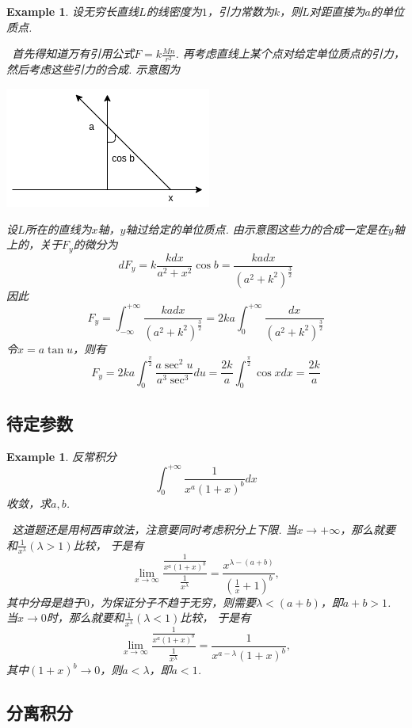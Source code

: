 \documentclass{article}
\newtheorem{example}[theorem]{Example}
\newcommand{\hints}{{\color{blue} \text{hints}}}
\begin{document}
\begin{example}
\rm 设无穷长直线$L$的线密度为$1$，引力常数为$k$，则$L$对距直接为$a$的单位质点.

\hints\ 首先得知道万有引用公式$F = k \frac{Mn}{r^2}$. 再考虑直线上某个点对给定单位质点的引力，然后考虑这些引力的合成. 示意图为
\begin{center}
\includegraphics[scale=0.6]{images/universal_gravitation.png}
\end{center}
设$L$所在的直线为$x$轴，$y$轴过给定的单位质点. 由示意图这些力的合成一定是在$y$轴上的，关于$F_y$的微分为
$$
dF_y = k \frac{kdx}{a^2 + x^2} \cos b = \frac{kadx}{(a^2+k^2)^{\frac{3}{2}}}
$$
因此
$$
F_y = \int_{-\infty}^{+\infty} \frac{kadx}{(a^2+k^2)^{\frac{3}{2}}} = 2ka \int_{0}^{+\infty} \frac{dx}{(a^2+k^2)^{\frac{3}{2}}}
$$
令$x = a\tan u$，则有
$$
F_y = 2ka \int_{0}^{\frac{\pi}{2}} \frac{a\sec^2 u}{a^3\sec^3}du = \frac{2k}{a} \int_{0}^{\frac{\pi}{2}} \cos x dx = \frac{2k}{a}
$$
\end{example}

\subsection{待定参数}

\begin{example}
\rm 反常积分
$$
\int_0^{+\infty} \frac{1}{x^a(1+x)^b}dx
$$
收敛，求$a,b$.

\hints\ 这道题还是用柯西审敛法，注意要同时考虑积分上下限. 当$x \to +\infty$，那么就要和$\frac{1}{x^{\lambda}}(\lambda >1)$比较， 于是有
$$
\lim\limits_{x \to \infty} \frac{\frac{1}{x^a(1+x)^b}}{\frac{1}{x^{\lambda}}} = \frac{x^{\lambda-(a+b)}}{(\frac{1}{x}+1)^b},
$$
其中分母是趋于$0$，为保证分子不趋于无穷，则需要$\lambda < (a+b)$，即$a+b > 1$. 当$x \to 0$时，那么就要和$\frac{1}{x^{\lambda}}(\lambda < 1)$比较， 于是有
$$
\lim\limits_{x \to \infty} \frac{\frac{1}{x^a(1+x)^b}}{\frac{1}{x^{\lambda}}} = \frac{1}{x^{a-\lambda}(1+x)^b},
$$
其中$(1+x)^b \to 0$，则$a < \lambda$，即$a < 1$.
\end{example}

\subsection{分离积分}
\end{document}
